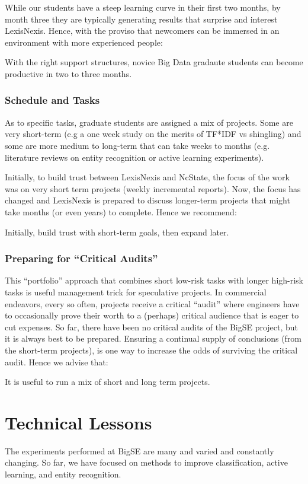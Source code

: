 \documentclass{sig-alternate-05-2015}
\theoremstyle{break}
\begin{document}
 While our  students have a steep learning curve in their
 first two months, by month three they are typically generating results that surprise and interest LexisNexis.
 Hence, with the proviso that  newcomers can be immersed in an environment
 with  more experienced people:
  \begin{lesson}
With the right support structures, novice
Big Data gradaute students
can become productive in two to three months.
\end{lesson}
 \subsubsection{Schedule and Tasks}
As to specific tasks, graduate students are assigned a mix of projects. Some are very short-term (e.g a one week
study on the merits of TF*IDF vs shingling) and some are more medium to long-term
that can take weeks to months (e.g. literature reviews on entity recognition or
active learning experiments). 

Initially, to build trust between LexisNexis and NcState, the focus of the work was on very
short term projects (weekly incremental reports). Now, the focus has changed and
LexisNexis is prepared to discuss longer-term projects that might take months (or even
years) to complete.  Hence we recommend:
\begin{lesson}
Initially, build trust with   short-term goals,
then expand   later.
\end{lesson}
\subsubsection{Preparing for  ``Critical Audits''}
This ``portfolio'' approach  that combines short low-risk tasks with longer high-risk tasks is useful management trick for speculative projects.
In commercial endeavors, every so often, projects receive a critical  ``audit''  where engineers have to
occasionally prove their worth to a (perhaps) critical audience that is eager  to cut
expenses.  So far,
there have been no critical audits of the BigSE project, but it is always
best to be prepared.
Ensuring a continual supply of conclusions (from the short-term projects),
is one way to increase the odds of surviving the critical audit. Hence we advise that:
\begin{lesson}
It is useful to run a mix of short and long term projects.
\end{lesson}
 
  


\section{Technical Lessons}
\label{sect:Method}
The experiments performed at BigSE are many and varied and constantly
changing. So far, we have focused on 
methods to improve classification, active learning, and entity
recognition. 
\end{document}
